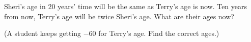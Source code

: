 Sheri's age in $20$ years' time will be the same as Terry's age is now. Ten years from now, Terry's age will be twice Sheri's age. What are their ages now?

(A student keeps getting $-60$ for Terry's age. Find the correct ages.)
